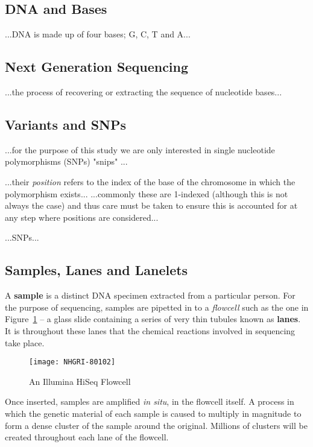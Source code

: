 \subsection{DNA and Bases}

...DNA is made up of four bases; G, C, T and A...


\subsection{Next Generation Sequencing}

...the process of recovering or extracting the sequence of nucleotide bases...


\subsection{Variants and SNPs}
...for the purpose of this study we are only interested in single nucleotide
polymorphisms (SNPs) "snips" ...

...their \textit{position} refers to the index of the base of the chromosome in
which the polymorphism exists...
...commonly these are 1-indexed (although this is not always the case) and thus
care must be taken to ensure this is accounted for at any step where positions
are considered...

...SNPs...


\subsection{Samples, Lanes and Lanelets}
\label{chap:samplelanelanelets}

A \textbf{sample} is a distinct DNA specimen extracted from a particular person.
For the purpose of sequencing, samples are pipetted in to a \textit{flowcell}
such as the one in Figure~\ref{fig:flowcell} -- a glass slide
containing a series of very thin tubules known as \textbf{lanes}.  It is
throughout these lanes that the chemical reactions involved in sequencing take place.

\begin{figure}[htbp!]
    \centering
    \texttt{[image: NHGRI-80102]}
    \caption[flowcell]{An Illumina HiSeq Flowcell\citep{img:flowcell}}
    \label{fig:flowcell}
\end{figure}

Once inserted, samples are amplified \textit{in situ}, in the flowcell itself. A
process in which the genetic material of each sample is caused to multiply in
magnitude to form a dense cluster of the sample around the original. Millions of
clusters will be created throughout each lane of the flowcell.

